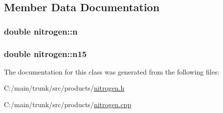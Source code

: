 \subsection{Member Data Documentation}
\hypertarget{classnitrogen_aa708078375ba23f1dd31e08e28269dac}{
\subsubsection[{n}]{\setlength{\rightskip}{0pt plus 5cm}double {\bf nitrogen::n}}}
\label{classnitrogen_aa708078375ba23f1dd31e08e28269dac}
\hypertarget{classnitrogen_a2d537cc848da50f09b7580539f261dfc}{
\subsubsection[{n15}]{\setlength{\rightskip}{0pt plus 5cm}double {\bf nitrogen::n15}}}
\label{classnitrogen_a2d537cc848da50f09b7580539f261dfc}


The documentation for this class was generated from the following files:\begin{DoxyCompactItemize}
\item 
C:/main/trunk/src/products/\hyperlink{nitrogen_8h}{nitrogen.h}\item 
C:/main/trunk/src/products/\hyperlink{nitrogen_8cpp}{nitrogen.cpp}\end{DoxyCompactItemize}
